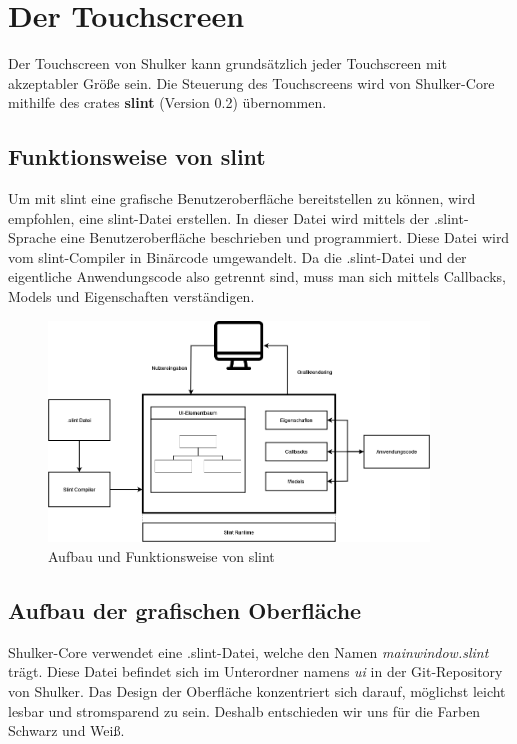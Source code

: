 \chapter{Der Touchscreen}
Der Touchscreen von Shulker kann grundsätzlich jeder Touchscreen mit akzeptabler Größe sein.
Die Steuerung des Touchscreens wird von Shulker-Core mithilfe des crates \textbf{slint} (Version 0.2) übernommen.

\section{Funktionsweise von slint}
Um mit slint eine grafische Benutzeroberfläche bereitstellen zu können, wird empfohlen, eine slint-Datei erstellen.
In dieser Datei wird mittels der .slint-Sprache eine Benutzeroberfläche beschrieben und programmiert. Diese Datei wird vom 
slint-Compiler in Binärcode umgewandelt. Da die .slint-Datei und der eigentliche Anwendungscode also getrennt sind, muss man sich
mittels Callbacks, Models und Eigenschaften verständigen. 
\begin{figure}[H]
    \begin{center}
        \includegraphics[width=0.9\textwidth]{images/core/slint_aufbau.png}
        \caption{Aufbau und Funktionsweise von slint}
    \end{center}
\end{figure}

\section{Aufbau der grafischen Oberfläche}
Shulker-Core verwendet eine .slint-Datei, welche den Namen \textit{mainwindow.slint} trägt. Diese Datei befindet sich im Unterordner
namens \textit{ui} in der Git-Repository von Shulker. Das Design der Oberfläche konzentriert sich darauf, möglichst leicht
lesbar und stromsparend zu sein. Deshalb entschieden wir uns für die Farben Schwarz und Weiß.

